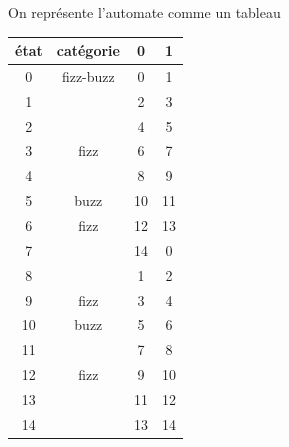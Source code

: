 \begin{corrections}
  On représente l'automate comme un tableau
  
  \begin{tabular}{|c|c|c|c|}
    \hline
    état & catégorie & 0 & 1 \\
    \hline
    0  & fizz-buzz & 0  & 1  \\ 
    1  &           & 2  & 3  \\ 
    2  &           & 4  & 5  \\ 
    3  & fizz      & 6  & 7  \\ 
    4  &           & 8  & 9  \\ 
    5  & buzz      & 10 & 11 \\ 
    6  & fizz      & 12 & 13 \\ 
    7  &           & 14 & 0  \\ 
    8  &           & 1  & 2  \\ 
    9  & fizz      & 3  & 4  \\ 
    10 & buzz      & 5  & 6  \\ 
    11 &           & 7  & 8  \\ 
    12 & fizz      & 9  & 10 \\ 
    13 &           & 11 & 12 \\ 
    14 &           & 13 & 14 \\ 
    \hline
  \end{tabular}
\end{corrections}

\endgroup
\endinput
